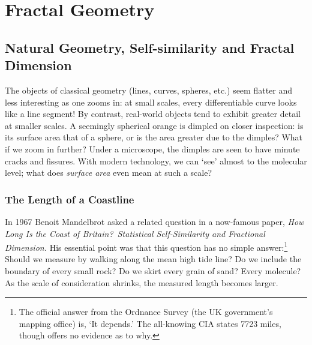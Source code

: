 \graphicspath{{5Fractals/asy/}}

\section{Fractal Geometry}

\subsection{Natural Geometry, Self-similarity and Fractal Dimension}\label{sec:fracdefn}

The objects of classical geometry (lines, curves, spheres, etc.) seem flatter and less interesting as one zooms in: at small scales, every differentiable curve looks like a line segment! By contrast, real-world objects tend to exhibit greater detail at smaller scales. A seemingly spherical orange is dimpled on closer inspection: is its surface area that of a sphere, or is the area greater due to the dimples? What if we zoom in further? Under a microscope, the dimples are seen to have minute cracks and fissures. With modern technology, we can `see' almost to the molecular level; what does \emph{surface area} even mean at such a scale?

\subsubsection*{The Length of a Coastline} 

In 1967 Benoit Mandelbrot asked a related question in a now-famous paper, \emph{How Long Is the Coast of Britain?\ Statistical Self-Similarity and Fractional Dimension.} His essential point was that this question has no simple answer:\footnote{%
	The official answer from the Ordnance Survey (the UK government's mapping office) is, `It depends.' The all-knowing CIA states 7723 miles, though offers no evidence as to why.%
}
Should we measure by walking along the mean high tide line? Do we include the boundary of every small rock? Do we skirt every grain of sand? Every molecule? As the scale of consideration shrinks, the measured length becomes larger.
\smallbreak

